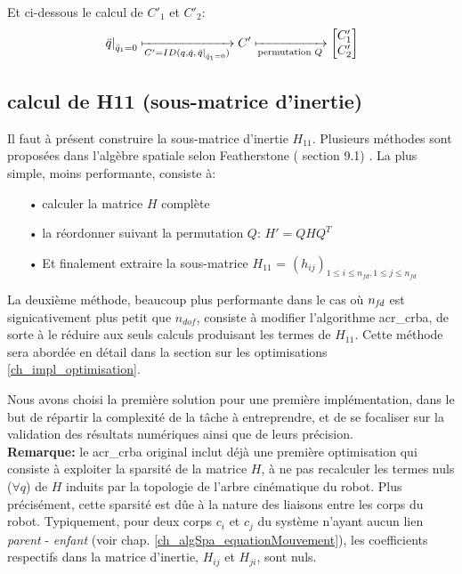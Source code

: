 \documentclass{report}
\begin{document}
\medskip
Et ci-dessous le calcul de $C'_1$ et $C'_2$:
\begin{equation*}
\left. \ddot{q} \right\vert_{\ddot{q}_1=0} \xmapsto[C'=ID(q,\dot{q},\left. \ddot{q} \right\vert_{\ddot{q}_1=0})]{} C'
\xmapsto[\textnormal{permutation $Q$}]{} 
\begin{bmatrix}
  C'_1 \\
  C'_2
\end{bmatrix}
\end{equation*}


\subsection{calcul de H11 (sous-matrice d'inertie)}

Il faut à présent construire la sous-matrice d'inertie $H_{11}$. Plusieurs méthodes sont proposées dans l'algèbre spatiale selon Featherstone (\cite{bib_featherstone} section 9.1) . La plus simple, moins performante, consiste à:
\begin{itemize}
\item[•] calculer la matrice $H$ complète
\item[•] la réordonner suivant la permutation $Q$: $H'=Q H Q^T$
\item[•] Et finalement extraire la sous-matrice $H_{11}$ = $(h_{ij})_{1 \leqslant i \leqslant n_{fd},1 \leqslant j \leqslant n_{fd}}$
\end{itemize}
\bigskip
La deuxième méthode, beaucoup plus performante dans le cas où $n_{\emph{fd}}$ est signicativement plus petit que $n_{dof}$, consiste à modifier l'algorithme \gls{acr_crba}, de sorte à le réduire aux seuls calculs produisant les termes de $H_{11}$. Cette méthode sera abordée en détail dans la section sur les optimisations \ref{ch_impl_optimisation}.

Nous avons choisi la première solution pour une première implémentation, dans le but de répartir la complexité de la tâche à entreprendre, et de se focaliser sur la validation des résultats numériques ainsi que de leurs précision.\\
\textbf{Remarque:} le \gls{acr_crba} original inclut déjà une première optimisation qui consiste à exploiter la sparsité de la matrice $H$, \cad à ne pas recalculer les termes nuls ($\forall q$) de $H$ induits par la topologie de l'arbre cinématique du robot. Plus précisément, cette sparsité est dûe à la nature des liaisons entre les corps du robot. Typiquement, pour deux corps $c_i$ et $c_j$ du système n'ayant aucun lien \emph{parent} - \emph{enfant} (voir chap. \ref{ch_algSpa_equationMouvement}), les coefficients respectifs dans la matrice d'inertie, $H_{ij}$ et $H_{ji}$, sont nuls.
\end{document}
